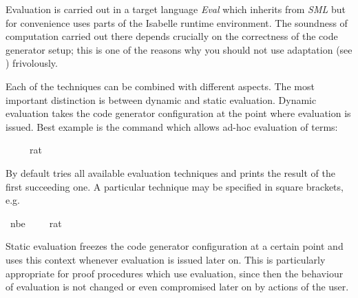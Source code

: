 \begin{isabellebody}
\begin{isamarkuptext}
  Evaluation is carried out in a target language \emph{Eval} which
  inherits from \emph{SML} but for convenience uses parts of the
  Isabelle runtime environment.  The soundness of computation carried
  out there depends crucially on the correctness of the code
  generator setup; this is one of the reasons why you should not use
  adaptation (see ) frivolously.%
\end{isamarkuptext}%
\isamarkuptrue%
%
\isamarkuptrue%
%
\begin{isamarkuptext}%
Each of the techniques can be combined with different aspects.  The
  most important distinction is between dynamic and static evaluation.
  Dynamic evaluation takes the code generator configuration  at the point where evaluation is issued.  Best example is the
  \hypertarget{command.value}{\hyperlink{command.value}{\mbox{}}} command which allows ad-hoc evaluation of
  terms:%
\end{isamarkuptext}%
\isamarkuptrue%
%
\isadelimquote
%
\endisadelimquote
%
\isatagquote
{}\isamarkupfalse%
\ {\isachardoublequoteopen}{}{}\ {\isacharslash}\ {\isacharparenleft}{}{}\ {\isacharcolon}{\isacharcolon}\ rat{\isacharparenright}{\isachardoublequoteclose}%
\endisatagquote
{\isafoldquote}%
%
\isadelimquote
%
\endisadelimquote
%
\begin{isamarkuptext}%
\noindent By default \hyperlink{command.value}{\mbox{}} tries all available evaluation
  techniques and prints the result of the first succeeding one.  A particular
  technique may be specified in square brackets, e.g.%
\end{isamarkuptext}%
\isamarkuptrue%
%
\isadelimquote
%
\endisadelimquote
%
\isatagquote
{}\isamarkupfalse%
\ {\isacharbrackleft}nbe{\isacharbrackright}\ {\isachardoublequoteopen}{}{}\ {\isacharslash}\ {\isacharparenleft}{}{}\ {\isacharcolon}{\isacharcolon}\ rat{\isacharparenright}{\isachardoublequoteclose}%
\endisatagquote
{\isafoldquote}%
%
\isadelimquote
%
\endisadelimquote
%
\begin{isamarkuptext}%
Static evaluation freezes the code generator configuration at a
  certain point and uses this context whenever evaluation is issued
  later on.  This is particularly appropriate for proof procedures
  which use evaluation, since then the behaviour of evaluation is not
  changed or even compromised later on by actions of the user.


\end{isamarkuptext}
\end{isabellebody}
